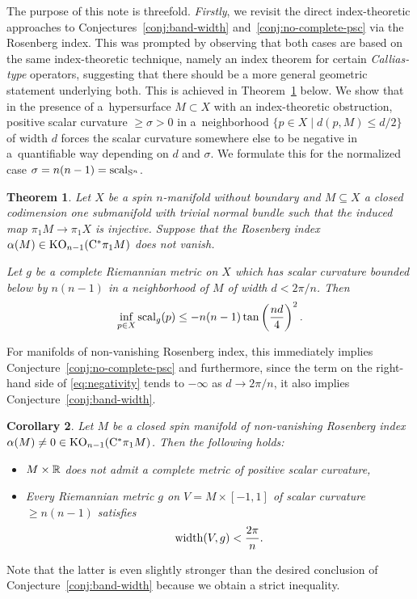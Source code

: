 \documentclass[pdftex]{sigma}
\numberwithin{equation}{section}
\newtheorem{Theorem}{Theorem}[section]
\newtheorem{Corollary}[Theorem]{Corollary}
\begin{document}
The purpose of this note is threefold.
\emph{Firstly}, we revisit the direct index-theoretic approaches to Conjectures~\ref{conj:band-width} and~\ref{conj:no-complete-psc} via the Rosenberg index.
This was prompted by observing that both cases are based on the same index-theoretic technique, namely an index theorem for certain \emph{Callias-type} operators, suggesting that there should be a more general geometric statement underlying both.
This is achieved in Theorem~\ref{thm:quantitative-codim1-obstr} below.
We show that in the presence of a~hypersurface \(M \subset X\) with an index-theoretic obstruction, positive scalar curvature \(\geq \sigma > 0\) in a~neighborhood \(\{p \in X \mid d(p, M) \leq d/2 \}\) of width \(d\) forces the scalar curvature somewhere else to be negative in a~quantifiable way depending on \(d\) and \(\sigma\).
We formulate this for the normalized case \(\sigma = n(n-1) = \operatorname{scal}_{\mathrm{S}^n}\).

\begin{Theorem} \label{thm:quantitative-codim1-obstr}
 Let \(X\) be a spin \(n\)-manifold without boundary and \(M \subseteq X\) a closed codimension one submanifold with trivial normal bundle such that the induced map \(\pi_1 M \to \pi_1 X\) is injective.
 Suppose that the Rosenberg index \(\alpha(M) \in \operatorname{KO}_{n-1}(\mathrm{C}^\ast \pi_1 M)\) does not vanish.

 Let \(g\) be a complete Riemannian metric on \(X\) which has scalar curvature bounded below by \(n(n-1)\) in a neighborhood of \(M\) of width \(d < 2\pi/n\).
 Then
 \begin{equation} \label{eq:negativity}
 \inf_{p \in X} \operatorname{scal}_g(p) \leq - n(n-1) \tan\left(\frac{nd}{4}\right)^2.
 \end{equation}
\end{Theorem}

For manifolds of non-vanishing Rosenberg index, this immediately implies Conjecture~\ref{conj:no-complete-psc} and furthermore, since the term on the right-hand side of \eqref{eq:negativity} tends to \(-\infty\) as \(d \to 2 \pi /n\), it also implies Conjecture~\ref{conj:band-width}.

\begin{Corollary}\label{cor:noPSc-and-bandWidth}
 Let \(M\) be a closed spin manifold of non-vanishing Rosenberg index \(\alpha(M) \neq 0 \in \operatorname{KO}_{n-1}(\mathrm{C}^\ast \pi_1 M)\).
 Then the following holds:
 \begin{itemize}\itemsep=0pt
 \item \(M \times \mathbb{R}\) does not admit a complete metric of positive scalar curvature,
 \item Every Riemannian metric \(g\) on \(V = M \times [-1,1]\) of scalar curvature \(\geq n(n-1)\) satisfies
 \[
 \operatorname{width}(V, g) < \frac{2\pi}{n}.
 \]
 \end{itemize}
\end{Corollary}
Note that the latter is even slightly stronger than the desired conclusion of Conjecture~\ref{conj:band-width} because we obtain a strict inequality.
\end{document}

